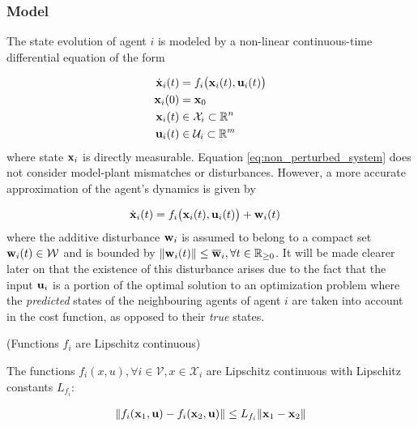 \subsubsection{Model}

The state evolution of agent $i$ is modeled by a non-linear continuous-time
differential equation of the form

\begin{align}
  \dot{\bm{\mathbf{x}}}_i(t) &= f_i \big(\bm{\mathbf{x}}_i (t), \bm{\mathbf{u}}_i (t)\big) \label{eq:non_perturbed_system}\\
  \bm{\mathbf{x}}_i(0) &= \bm{\mathbf{x}}_0 \\
  \bm{\mathbf{x}}_i (t) &\in \mathcal{X}_i \subset \mathbb{R}^n \\
  \bm{\mathbf{u}}_i (t) &\in \mathcal{U}_i \subset \mathbb{R}^m
\end{align}
where state $\bm{\mathbf{x}}_i$ is directly measurable. Equation
\ref{eq:non_perturbed_system} does not consider model-plant mismatches or
disturbances. However, a more accurate approximation of the agent's dynamics
is given by

\begin{align}
  \dot{\bm{\mathbf{x}}}_i(t) &= f_i \big(\bm{\mathbf{x}}_i (t), \bm{\mathbf{u}}_i (t) \big) + \bm{\mathbf{w}}_i (t) \label{eq:perturbed_system}
\end{align}
where the additive disturbance $\bm{\mathbf{w}}_i$ is assumed
to belong to a compact set $\bm{\mathbf{w}}_i(t) \in \mathcal{W}$ and is bounded by
$\|\bm{\mathbf{w}}_i(t)\| \leq \overline{\bm{\mathbf{w}}}_i,\forall t \in \mathbb{R}_{\geq 0}$.
It will be made clearer later on that the existence of this disturbance arises
due to the fact that the input $\bm{\mathbf{u}}_i$ is a portion of the optimal solution
to an optimization problem where the \textit{predicted} states of the
neighbouring agents of agent $i$ are taken into account in the cost function,
as opposed to their \textit{true} states.

\begin{gg_box}
\begin{assumption} (Functions $f_i$ are Lipschitz continuous)

  The functions $f_i(x,u), \forall i \in \mathcal{V}, x \in \mathcal{X}_i$
  are Lipschitz continuous with Lipschitz constants $L_{f_i}$:

  \begin{align}
    \| f_i(\bm{\mathbf{x}}_1, \bm{\mathbf{u}}) - f_i(\bm{\mathbf{x}}_2, \bm{\mathbf{u}})\| \leq L_{f_i} \|\bm{\mathbf{x}}_1 - \bm{\mathbf{x}}_2 \|
  \end{align}

  \label{ass:f_i_Lipschitz}
\end{assumption}
\end{gg_box}


